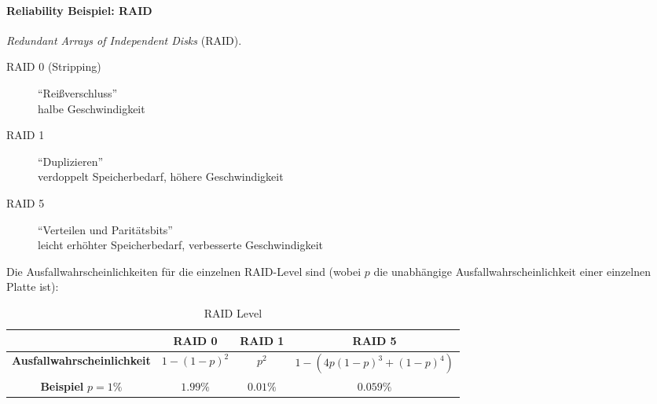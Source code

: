         \paragraph{Reliability Beispiel: RAID}
		    \textit{Redundant Arrays of Independent Disks} (RAID).
		    
		    \begin{description}
		    	\item[RAID 0 (Stripping)] \enquote{Reißverschluss} \\ halbe Geschwindigkeit
		    	\item[RAID 1] \enquote{Duplizieren} \\ verdoppelt Speicherbedarf, höhere Geschwindigkeit
		    	\item[RAID 5] \enquote{Verteilen und Paritätsbits} \\ leicht erhöhter Speicherbedarf, verbesserte Geschwindigkeit
		    \end{description}
		    
		    Die Ausfallwahrscheinlichkeiten für die einzelnen RAID-Level sind (wobei \(p\) die unabhängige Ausfallwahrscheinlichkeit einer einzelnen Platte ist):
		    \begin{table}[H]
		    	\centering
		    	\begin{tabular}{| c | c | c | c |}
		    		\hline
		    		                                   & \textbf{RAID 0}     & \textbf{RAID 1} & \textbf{RAID 5}               \\ \hline
		    		\textbf{Ausfallwahrscheinlichkeit} & \( 1 - (1 - p)^2 \) & \( p^2 \)       & \( 1 - (4p(1-p)^3+(1-p)^4) \) \\ \hline
		    		\textbf{Beispiel} \( p = 1\% \)    & \( 1.99\% \)        & \( 0.01\% \)    & \( 0.059\% \)                 \\ \hline
		    	\end{tabular}
		    	\caption{RAID Level}
		    \end{table}

